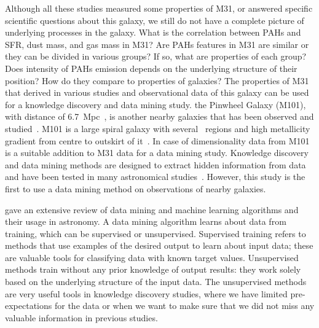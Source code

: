 Although all these studies measured some properties of M31, or answered specific scientific questions about this galaxy, we still do not have a complete picture of underlying processes in the galaxy.
What is the correlation between PAHs and SFR, dust mass, and gas mass in M31? 
Are PAHs features in M31 are similar or they can be divided in various groups? If so, what are properties of each group?
Does intensity of PAHs emission depends on the underlying structure of their position? 
How do they compare to properties of galaxies?
The properties of M31 that derived in various studies and observational data of this galaxy can be used for a knowledge discovery and data mining study.
the Pinwheel Galaxy (M101), with distance of 6.7~Mpc~\citep{Freedman01}, is another nearby galaxies that has been observed and studied~\citep[e.g][and references therein]{Kennicutt11,Dale09, Leroy08, Gordon08}.
M101 is a large spiral galaxy with several \hii~regions and high metallicity gradient from centre to outskirt of it~\citep{Kennicutt03}.
In case of dimensionality data from M101 is a suitable addition to M31 data for a data mining study.
Knowledge discovery and data mining methods are designed to extract hidden information from data and have been tested in many astronomical studies~\citep[e.g.][and references therein]{Ball10}.
However, this study is the first to use a data mining method on observations of nearby galaxies.

\cite{Ball10} gave an extensive review of data mining and machine learning algorithms and their usage in astronomy.
A data mining algorithm learns about data from training, which can be supervised or unsupervised.
Supervised training refers to methods that use examples of the desired output to learn about input data; these are valuable tools for classifying data with known target values.
Unsupervised methods train without any prior knowledge of output results: 
they work solely based on the underlying structure of the input data.   
The unsupervised methods are very useful tools in knowledge discovery studies, where we have limited pre-expectations for the data or when we want to make sure that we did not miss any valuable information in previous studies.

